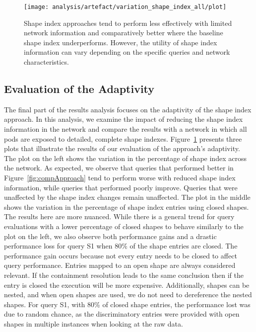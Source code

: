 \begin{figure}[h]
    \centering
    \texttt{[image: analysis/artefact/variation\_shape\_index\_all/plot]}
    \caption{
    Shape index approaches tend to perform less effectively with limited network information and comparatively better where the baseline shape index underperforms.
    However, the utility of shape index information can vary depending on the specific queries and network characteristics.
    }
    \label{fig:adaptShapeIndex}
\end{figure}

\subsection{Evaluation of the Adaptivity}

The final part of the results analysis focuses on the adaptivity of the shape index approach.
In this analysis, we examine the impact of reducing the shape index information in the network and compare the results with a network in which all pods are exposed to detailed, complete shape indexes.
Figure~\ref{fig:adaptShapeIndex} presents three plots that illustrate the results of our evaluation of the approach's adaptivity.
The plot on the left shows the variation in the percentage of shape index across the network. 
As expected, we observe that queries that performed better in Figure~\ref{fig:compApproach} tend to perform worse with reduced shape index information, while queries that performed poorly improve. 
Queries that were unaffected by the shape index changes remain unaffected.
The plot in the middle shows the variation in the percentage of shape index entries using closed shapes.
The results here are more nuanced.
While there is a general trend for query evaluations with a lower percentage of closed shapes to behave similarly to the plot on the left, we also observe both performance gains and a drastic performance loss for query S1 when 80\% of the shape entries are closed.
The performance gain occurs because not every entry needs to be closed to affect query performance.
Entries mapped to an open shape are always considered relevant.
If the containment resolution leads to the same conclusion then if the entry is closed the execution will be more expensive. 
Additionally, shapes can be nested, and when open shapes are used, we do not need to dereference the nested shapes.
For query S1, with 80\% of closed shape entries, the performance lost was due to random chance, as the discriminatory entries were provided with open shapes in multiple instances when looking at the raw data.
